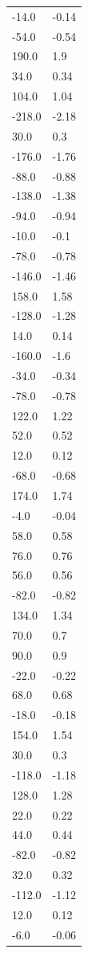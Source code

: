 \begin{longtable}{ll}
-14.0 & -0.14 \\
-54.0 & -0.54 \\
190.0 & 1.9 \\
34.0 & 0.34 \\
104.0 & 1.04 \\
-218.0 & -2.18 \\
30.0 & 0.3 \\
-176.0 & -1.76 \\
-88.0 & -0.88 \\
-138.0 & -1.38 \\
-94.0 & -0.94 \\
-10.0 & -0.1 \\
-78.0 & -0.78 \\
-146.0 & -1.46 \\
158.0 & 1.58 \\
-128.0 & -1.28 \\
14.0 & 0.14 \\
-160.0 & -1.6 \\
-34.0 & -0.34 \\
-78.0 & -0.78 \\
122.0 & 1.22 \\
52.0 & 0.52 \\
12.0 & 0.12 \\
-68.0 & -0.68 \\
174.0 & 1.74 \\
-4.0 & -0.04 \\
58.0 & 0.58 \\
76.0 & 0.76 \\
56.0 & 0.56 \\
-82.0 & -0.82 \\
134.0 & 1.34 \\
70.0 & 0.7 \\
90.0 & 0.9 \\
-22.0 & -0.22 \\
68.0 & 0.68 \\
-18.0 & -0.18 \\
154.0 & 1.54 \\
30.0 & 0.3 \\
-118.0 & -1.18 \\
128.0 & 1.28 \\
22.0 & 0.22 \\
44.0 & 0.44 \\
-82.0 & -0.82 \\
32.0 & 0.32 \\
-112.0 & -1.12 \\
12.0 & 0.12 \\
-6.0 & -0.06 \\

\end{longtable}
